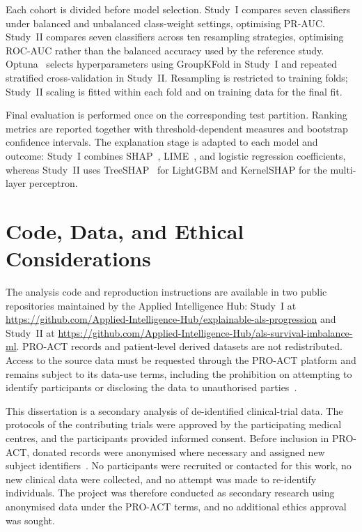 Each cohort is divided before model selection. Study~I compares seven classifiers under balanced and unbalanced class-weight settings, optimising \gls{PR-AUC}. Study~II compares seven classifiers across ten resampling strategies, optimising \gls{ROC-AUC} rather than the balanced accuracy used by the reference study. Optuna~\cite{optuna2019} selects hyperparameters using GroupKFold in Study~I and repeated stratified cross-validation in Study~II. Resampling is restricted to training folds; Study~II scaling is fitted within each fold and on training data for the final fit.

Final evaluation is performed once on the corresponding test partition. Ranking metrics are reported together with threshold-dependent measures and bootstrap confidence intervals. The explanation stage is adapted to each model and outcome: Study~I combines \gls{SHAP}~\cite{lundberg2017shap}, \gls{LIME}~\cite{ribeiro2016lime}, and logistic regression coefficients, whereas Study~II uses TreeSHAP~\cite{lundberg2020treeshap} for LightGBM and KernelSHAP for the multi-layer perceptron.

\section{Code, Data, and Ethical Considerations}
\label{subsec:availability_ethics}

The analysis code and reproduction instructions are available in two public repositories maintained by the Applied Intelligence Hub: Study~I at \url{https://github.com/Applied-Intelligence-Hub/explainable-als-progression} and Study~II at \url{https://github.com/Applied-Intelligence-Hub/als-survival-imbalance-ml}. PRO-ACT records and patient-level derived datasets are not redistributed. Access to the source data must be requested through the PRO-ACT platform and remains subject to its data-use terms, including the prohibition on attempting to identify participants or disclosing the data to unauthorised parties~\cite{PROACTterms}.

This dissertation is a secondary analysis of de-identified clinical-trial data. The protocols of the contributing trials were approved by the participating medical centres, and the participants provided informed consent. Before inclusion in PRO-ACT, donated records were anonymised where necessary and assigned new subject identifiers~\cite{PROACTethics}. No participants were recruited or contacted for this work, no new clinical data were collected, and no attempt was made to re-identify individuals. The project was therefore conducted as secondary research using anonymised data under the PRO-ACT terms, and no additional ethics approval was sought.

